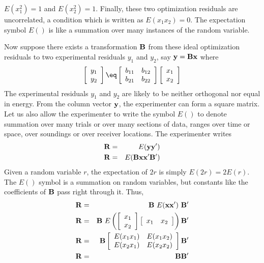 $E(x_1^2)=1$
and 
$E(x_2^2)=1$.
Finally, these two optimization residuals are uncorrelated,
a condition which is written as $E(x_1 x_2)=0$.
The expectation symbol $E()$ is like a summation
over many instances of the random variable.
\par
Now suppose there exists a transformation $\bold B$
from these ideal optimization residuals
to two experimental residuals $y_1$ and $y_2$, say
$\bold y = \bold B \bold x$ where
\begin{equation}
  \left[
    \begin{array}{l}
      y_1 \\
      y_2
    \end{array}
  \right]
  \eq
  \left[
    \begin{array}{lr}
      b_{11} & b_{12}\\
      b_{21} & b_{22}
    \end{array}
  \right]
  \left[
    \begin{array}{l}
      x_1 \\
      x_2
    \end{array}
  \right]
\end{equation}
The experimental residuals $y_1$ and $y_2$ are
likely to be neither orthogonal nor equal in energy.
From the column vector $\bold y$,
the experimenter can form a square matrix.
Let us also allow the experimenter to write the symbol $E()$
to denote summation over many trials or over many sections
of data, ranges over time or space,
over soundings or over receiver locations.
The experimenter writes
\begin{eqnarray}
\bold R &=& E ( \bold y \bold y' ) \\
\bold R &=& E ( \bold B \bold x \bold x' \bold B' )
\end{eqnarray}
Given a random variable $r$,
the expectation of $2r$ is simply $E(2r)=2E(r)$.
The $E()$ symbol is a summation on random variables,
but constants like the coefficients of $\bold B$ pass
right through it.  Thus,
\begin{eqnarray}
\bold R &=&   \bold B\ E(\bold x \bold x')\ \bold B' \\
\bold R &=&   \bold B\
  E \left(
      \left[
        \begin{array}{l}
          x_1 \\
          x_2
        \end{array}
      \right]
      \left[
        \begin{array}{ll}
          x_1 & x_2
        \end{array}
      \right]
  \right)
\bold B'
                        \\
\bold R &=&   \bold B
      \left[
        \begin{array}{ll}
          E(x_1 x_1) & E(x_1 x_2)\\
          E(x_2 x_1) & E(x_2 x_2)
        \end{array}
      \right]
\bold B'
                        \\
\bold R &=&   \bold B \bold B'
\end{eqnarray}
